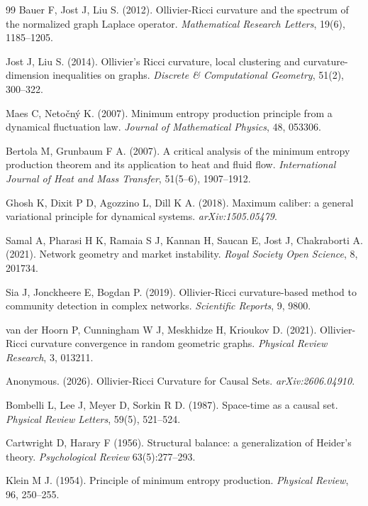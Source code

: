 \documentclass[11pt,a4paper]{article}
\begin{document}
\begin{thebibliography}{99}
Bauer F, Jost J, Liu S. (2012).
Ollivier-Ricci curvature and the spectrum of the normalized graph Laplace
operator.
\textit{Mathematical Research Letters}, 19(6), 1185--1205.

Jost J, Liu S. (2014).
Ollivier's Ricci curvature, local clustering and curvature-dimension
inequalities on graphs.
\textit{Discrete \& Computational Geometry}, 51(2), 300--322.

Maes C, Netočný K. (2007).
Minimum entropy production principle from a dynamical fluctuation law.
\textit{Journal of Mathematical Physics}, 48, 053306.

Bertola M, Grunbaum F A. (2007).
A critical analysis of the minimum entropy production theorem and its
application to heat and fluid flow.
\textit{International Journal of Heat and Mass Transfer}, 51(5--6), 1907--1912.

Ghosh K, Dixit P D, Agozzino L, Dill K A. (2018).
Maximum caliber: a general variational principle for dynamical systems.
\textit{arXiv:1505.05479}.

Samal A, Pharasi H K, Ramaia S J, Kannan H, Saucan E, Jost J, Chakraborti A.
(2021).
Network geometry and market instability.
\textit{Royal Society Open Science}, 8, 201734.

Sia J, Jonckheere E, Bogdan P. (2019).
Ollivier-Ricci curvature-based method to community detection in complex networks.
\textit{Scientific Reports}, 9, 9800.

van der Hoorn P, Cunningham W J, Meskhidze H, Krioukov D. (2021).
Ollivier-Ricci curvature convergence in random geometric graphs.
\textit{Physical Review Research}, 3, 013211.

Anonymous. (2026).
Ollivier-Ricci Curvature for Causal Sets.
\textit{arXiv:2606.04910}.

Bombelli L, Lee J, Meyer D, Sorkin R D. (1987).
Space-time as a causal set.
\textit{Physical Review Letters}, 59(5), 521--524.

Cartwright D, Harary F (1956).
Structural balance: a generalization of Heider's theory.
\emph{Psychological Review} 63(5):277--293.

Klein M J. (1954).
Principle of minimum entropy production.
\textit{Physical Review}, 96, 250--255.


\end{thebibliography}
\end{document}
